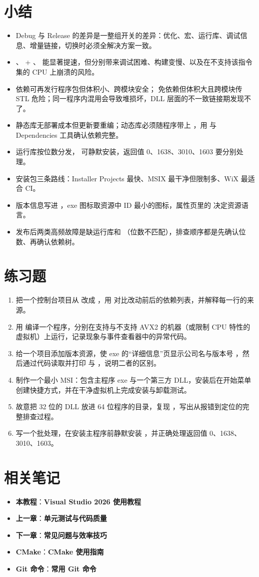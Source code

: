 \section{小结}
\begin{itemize}
  \item Debug 与 Release 的差异是一整组开关的差异：优化、宏、运行库、调试信息、增量链接，切换时必须全解决方案一致。
  \item {}、 + 、 能显著提速，但分别带来调试困难、构建变慢、以及在不支持该指令集的 CPU 上崩溃的风险。
  \item {} 依赖可再发行程序包但体积小、跨模块安全； 免依赖但体积大且跨模块传 STL 危险；同一程序内混用会导致堆损坏，DLL 层面的不一致链接期发现不了。
  \item 静态库无部署成本但更新要重编；动态库必须随程序带上 ，用  与 Dependencies 工具确认依赖完整。
  \item 运行库按位数分发， 可静默安装，返回值 0、1638、3010、1603 要分别处理。
  \item 安装包三条路线：Installer Projects 最快、MSIX 最干净但限制多、WiX 最适合 CI。
  \item 版本信息写进 ，exe 图标取资源中 ID 最小的图标，属性页里的  决定资源语言。
  \item 发布后两类高频故障是缺运行库和 （位数不匹配），排查顺序都是先确认位数、再确认依赖树。
\end{itemize}
\section{练习题}
\begin{enumerate}
  \item 把一个控制台项目从  改成 ，用  对比改动前后的依赖列表，并解释每一行的来源。
  \item 用  编译一个程序，分别在支持与不支持 AVX2 的机器（或限制 CPU 特性的虚拟机）上运行，记录现象与事件查看器中的异常代码。
  \item 给一个项目添加版本资源，使 exe 的“详细信息”页显示公司名与版本号 ，然后通过代码读取并打印  与 ，说明二者的区别。
  \item 制作一个最小 MSI：包含主程序 exe 与一个第三方 DLL，安装后在开始菜单创建快捷方式，并在干净虚拟机上完成安装与卸载测试。
  \item 故意把 32 位的 DLL 放进 64 位程序的目录，复现 ，写出从报错到定位的完整排查过程。
  \item 写一个批处理，在安装主程序前静默安装 ，并正确处理返回值 0、1638、3010、1603。
\end{enumerate}
\section{相关笔记}
\begin{itemize}
  \item \textbf{本教程}：\textbf{Visual Studio 2026 使用教程}
  \item \textbf{上一章}：\textbf{单元测试与代码质量}
  \item \textbf{下一章}：\textbf{常见问题与效率技巧}
  \item \textbf{CMake}：\textbf{CMake 使用指南}
  \item \textbf{Git 命令}：\textbf{常用 Git 命令}
\end{itemize}
